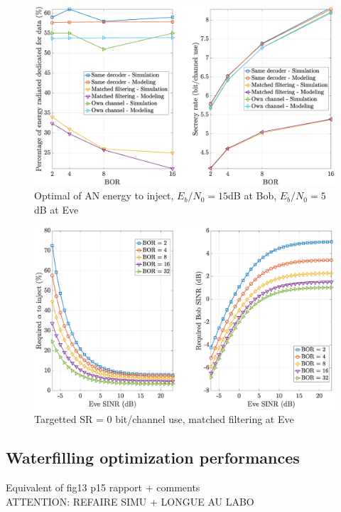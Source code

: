 \documentclass[journal,comsoc]{IEEEtran}
\let\MYoriglatexcaption\caption
\renewcommand{\caption}[2][\relax]{\MYoriglatexcaption[#2]{#2}}
\begin{document}
\begin{figure}[h!t]
	\centering
	\includegraphics[width=1\linewidth]{graphs/SISO_no_corr_optimal_alpha_EbN0b_15_EbN0e_5.eps}
	\caption{Optimal of AN energy to inject, $E_b/N_0 = 15$dB at Bob,  $E_b/N_0 = 5$dB at Eve}
	\label{fig_optimalAN}
\end{figure}



\begin{figure}[h!t]
	\centering
	\includegraphics[width=1\linewidth]{graphs/SISO_no_corr_targettedSR_0_model2.eps}
	\caption{Targetted SR = 0 bit/channel use, matched filtering at Eve}
	\label{fig_targettedSR}
\end{figure} 



\subsection{Waterfilling optimization performances}
{\color{red} Equivalent of fig13 p15 rapport + comments \\

ATTENTION: REFAIRE SIMU + LONGUE AU LABO}
\end{document}
